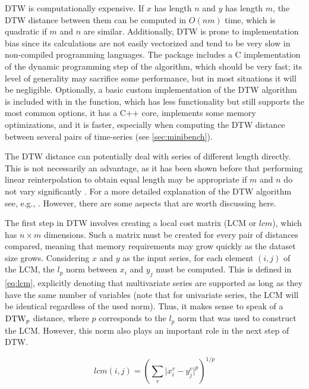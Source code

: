 DTW is computationally expensive.
If $x$ has length $n$ and $y$ has length $m$,
the DTW distance between them can be computed in $O(nm)$ time,
which is quadratic if $m$ and $n$ are similar.
Additionally, DTW is prone to implementation bias since its calculations are not easily vectorized and tend to be very slow in non-compiled programming languages.
The  package includes a C implementation of the dynamic programming step of the algorithm,
which should be very fast;
its level of generality may sacrifice some performance,
but in most situations it will be negligible.
Optionally, a basic custom implementation of the DTW algorithm is included with \dtwclust{} in the  function,
which has less functionality but still supports the most common options,
it has a C++ core,
implements some memory optimizations,
and it is faster,
especially when computing the DTW distance between several pairs of time-series
(see \cref{sec:minibench}).

The DTW distance can potentially deal with series of different length directly.
This is not necessarily an advantage,
as it has been shown before that performing linear reinterpolation to obtain equal length may be appropriate if $m$ and $n$ do not vary significantly \citep{keogh2004}.
For a more detailed explanation of the DTW algorithm see, e.g., \citet{giorgino2009}.
However, there are some aspects that are worth discussing here.

The first step in DTW involves creating a local cost matrix (LCM  or $lcm$),
which has $n \times m$ dimensions.
Such a matrix must be created for every pair of distances compared,
meaning that memory requirements may grow quickly as the dataset size grows.
Considering $x$ and $y$ as the input series,
for each element $(i,j)$ of the LCM,
the $l_p$ norm between $x_i$ and $y_j$ must be computed.
This is defined in \cref{eq:lcm},
explicitly denoting that multivariate series are supported as long as they have the same number of variables
(note that for univariate series, the LCM will be identical regardless of the used norm).
Thus, it makes sense to speak of a $\text{DTW}_p{}$ distance,
where $p$ corresponds to the $l_p$ norm that was used to construct the LCM.
However, this norm also plays an important role in the next step of DTW.

\begin{equation}
\label{eq:lcm}
lcm(i,j) = \left( \sum_v \lvert x^v_i - y^v_j \rvert ^ p \right) ^ {1/p}
\end{equation}

